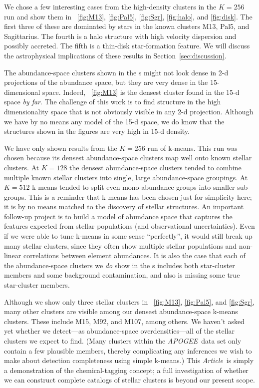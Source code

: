 \documentclass[12pt, letterpaper, preprint]{aastex}
\newcommand{\acronym}[1]{{\small{#1}}}
\newcommand{\project}[1]{\textsl{#1}}
\newcommand{\apogee}{\project{\acronym{APOGEE}}}
\newcommand{\documentname}{\textsl{Article}}
\newcommand{\sectionname}{Section}
\begin{document}
We chose a few interesting cases from the high-density clusters
in the $K=256$ run and show them in
\figurename~\ref{fig:M13}, \ref{fig:Pal5}, \ref{fig:Sgr},
\ref{fig:halo}, and \ref{fig:disk}.
The first three of these are dominated by stars in the known clusters
M13, Pal5, and Sagittarius.
The fourth is a halo structure with high velocity dispersion and
possibly accreted.
The fifth is a thin-disk star-formation feature.
We will discuss the astrophysical implications of these results in
\sectionname~\ref{sec:discussion}.

The abundance-space clusters shown in the \figurename s
might not look dense in 2-d projections of the abundance space, but they
are very dense in the 15-dimensional space.  Indeed,
\figurename~\ref{fig:M13} is the densest cluster found in the 15-d
space \emph{by far}.
The challenge of this work is to find structure in the high
dimensionality space that is not obviously visible in any 2-d projection.
Although we have by no means any model of the 15-d space, we do know
that the structures shown in the figures are very high in 15-d
density.

We have only shown results from the $K=256$ run of k-means.
This run was chosen because its densest abundance-space clusters map
well onto known stellar clusters.
At $K=128$ the densest abundance-space clusters tended to combine
multiple known stellar clusters into single, large abundance-space
groupings.
At $K=512$ k-means tended to split even mono-abundance groups into
smaller sub-groups.
This is a reminder that k-means has been chosen just for simplicity
here; it is by no means matched to the discovery of
stellar structures.
An important follow-up project is to build a model of abundance space
that captures the features expected from stellar populations (and observational uncertainties).
Even if we were able to tune k-means in some sense ``perfectly'', it
would still break up many stellar clusters, since they often show
multiple stellar populations and non-linear correlations between element abundances.
It is also the case that each of the abundance-space clusters we
\emph{do} show in the \figurename s includes both star-cluster members
and some background contamination, and also is missing some true
star-cluster members.

Although we show only three stellar clusters in
\figurename~\ref{fig:M13}, \ref{fig:Pal5}, and \ref{fig:Sgr}, many
other clusters are visible among our densest abundance-space k-means
clusters.
These include M15, M92, and M107, among others.
We haven't asked yet whether we detect---as abundance-space
overdensities---all of the stellar clusters we expect to find. (Many
clusters within the \apogee\ data set only contain a few plausible 
members, thereby  complicating any inferences we wish to make about 
detection completeness using simple k-means.) 
This \documentname\ is simply a demonstration of the chemical-tagging
concept; a full investigation of whether we can construct complete
catalogs of stellar clusters is beyond our present scope.
\end{document}
